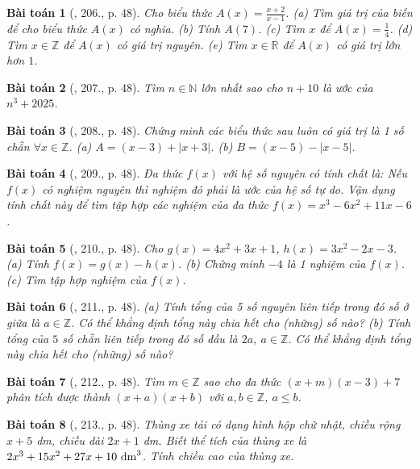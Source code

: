 \documentclass{article}
\newtheorem{baitoan}{Bài toán}
\begin{document}
\begin{baitoan}[\cite{Tuyen_Toan_7}, 206., p. 48]
	Cho biểu thức $A(x) = \frac{x + 2}{x - 1}$. (a) Tìm giá trị của biến để cho biểu thức $A(x)$ có nghĩa. (b) Tính $A(7)$. (c) Tìm $x$ để $A(x) = \frac{1}{4}$. (d) Tìm $x\in\mathbb{Z}$ để $A(x)$ có giá trị nguyên. (e) Tìm $x\in\mathbb{R}$ để $A(x)$ có giá trị lớn hơn $1$.
\end{baitoan}

\begin{baitoan}[\cite{Tuyen_Toan_7}, 207., p. 48]
	Tìm $n\in\mathbb{N}$ lớn nhất sao cho $n + 10$ là ước của $n^3 + 2025$.
\end{baitoan}

\begin{baitoan}[\cite{Tuyen_Toan_7}, 208., p. 48]
	Chứng minh các biểu thức sau luôn có giá trị là 1 số chẵn $\forall x\in\mathbb{Z}$. (a) $A = (x - 3) + |x + 3|$. (b) $B = (x - 5) - |x - 5|$.
\end{baitoan}

\begin{baitoan}[\cite{Tuyen_Toan_7}, 209., p. 48]
	Đa thức $f(x)$ với hệ số nguyên có tính chất là: Nếu $f(x)$ có nghiệm nguyên thì nghiệm đó phải là ước của hệ số tự do. Vận dụng tính chất này để tìm tập hợp các nghiệm của đa thức $f(x) = x^3 - 6x^2 + 11x - 6$.
\end{baitoan}

\begin{baitoan}[\cite{Tuyen_Toan_7}, 210., p. 48]
	Cho $g(x) = 4x^2 + 3x + 1$, $h(x) = 3x^2 - 2x - 3$. (a) Tính $f(x) = g(x) - h(x)$. (b) Chứng minh $-4$ là 1 nghiệm của $f(x)$. (c) Tìm tập hợp nghiệm của $f(x)$.
\end{baitoan}

\begin{baitoan}[\cite{Tuyen_Toan_7}, 211., p. 48]
	(a) Tính tổng của 5 số nguyên liên tiếp trong đó số ở giữa là $a\in\mathbb{Z}$. Có thể khẳng định tổng này chia hết cho (những) số nào? (b) Tính tổng của $5$ số chẵn liên tiếp trong đó số đầu là $2a$, $a\in\mathbb{Z}$. Có thể khẳng định tổng này chia hết cho (những) số nào?
\end{baitoan}

\begin{baitoan}[\cite{Tuyen_Toan_7}, 212., p. 48]
	Tìm $m\in\mathbb{Z}$ sao cho đa thức $(x + m)(x - 3) + 7$ phân tích được thành $(x + a)(x + b)$ với $a,b\in\mathbb{Z}$, $a\le b$.
\end{baitoan}

\begin{baitoan}[\cite{Tuyen_Toan_7}, 213., p. 48]
	Thùng xe tải có dạng hình hộp chữ nhật, chiều rộng $x + 5$ \emph{dm}, chiều dài $2x + 1$ \emph{dm}. Biết thể tích của thùng xe là $2x^3 + 15x^2 + 27x + 10\ {\rm dm}^3$. Tính chiều cao của thùng xe.
\end{baitoan}


\printbibliography[heading=bibintoc]
	
\end{document}
